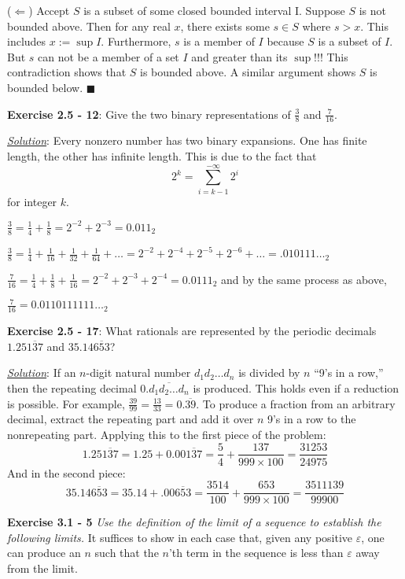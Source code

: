 \documentclass{article}
\begin{document}
($\Leftarrow$) Accept $S$ is a subset of some closed bounded interval I.
Suppose $S$ is not bounded above. Then for any real $x$, there exists some
$s \in S$ where $s > x$. This includes $x := \sup I$. Furthermore, $s$ is a
member of $I$ because $S$ is a subset of $I$. But $s$ can not be a member of
a set $I$ and greater than its $\sup$!!! This contradiction shows that
$S$ is bounded above. A similar argument shows $S$ is bounded below.
$\blacksquare$

\hrulefill

\textbf{Exercise 2.5 - 12}: Give the two binary representations of
$\frac{3}{8}$ and $\frac{7}{16}$.

\underline{\textit{Solution}}: 
Every nonzero number has two binary expansions. One has finite length,
the other has infinite length. This is due to the fact that $$2^{k}
= \sum_{i=k-1}^{-\infty} 2^i$$ for integer $k$.


$\frac{3}{8} = \frac{1}{4} + \frac{1}{8} = 2^{-2} + 2^{-3} = 0.011_2$

$\frac{3}{8} = \frac{1}{4} + \frac{1}{16} + \frac{1}{32} + \frac{1}{64}
+ \dots = 2^{-2} + 2^{-4} + 2^{-5} + 2^{-6} + \dots = {.010111\dots}_2$

$\frac{7}{16} = \frac{1}{4} + \frac{1}{8} + \frac{1}{16}
= 2^{-2} + 2^{-3} + 2^{-4} = 0.0111_2$ and by the same process as above,

$\frac{7}{16} = {0.0110111111 \dots}_2$

\hrulefill

\textbf{Exercise 2.5 - 17}: What rationals are represented by the periodic
decimals $1.25\overline{137}$ and $35.14\overline{653}$?

\underline{\textit{Solution}}:
If an $n$-digit natural number $d_1d_2\dots d_n$ is divided by $n$ ``9's in
a row,'' then the repeating decimal $0.\overline{d_1d_2\dots d_n}$ is
produced. This holds even if a reduction is possible. For example,
$\frac{39}{99} = \frac{13}{33} = 0.\overline{39}$. To produce a
fraction from an arbitrary decimal, extract the repeating part and add
it over $n$ 9's in a row to the nonrepeating part. Applying this to the
first piece of the problem:
$$1.25\overline{137} = 1.25 + 0.00\overline{137} = \frac{5}{4} +
\frac{137}{999\times100} = \frac{31253}{24975}$$
And in the second piece:
$$35.14\overline{653} = 35.14 + .00\overline{653} = \frac{3514}{100}
+ \frac{653}{999\times100} = \frac{3511139}{99900}$$

\hrulefill

\textbf{Exercise 3.1 - 5} \textit{Use the definition of the limit of a
sequence to establish the following limits.} It suffices to show in each
case that, given any positive $\varepsilon$, one can produce an $n$ such
that the $n$'th term in the sequence is less than $\varepsilon$ away
from the limit.
\end{document}
